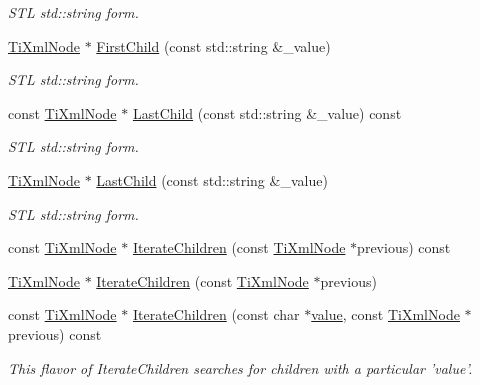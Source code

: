 \begin{DoxyCompactItemize}
\begin{DoxyCompactList}\small\item\em S\-T\-L std\-::string form. \end{DoxyCompactList}\item 
\hyperlink{class_ti_xml_node}{Ti\-Xml\-Node} $\ast$ \hyperlink{class_ti_xml_node_a10d2669ccb5e29e02fcb0e4408685ef6}{First\-Child} (const std\-::string \&\-\_\-value)
\begin{DoxyCompactList}\small\item\em S\-T\-L std\-::string form. \end{DoxyCompactList}\item 
const \hyperlink{class_ti_xml_node}{Ti\-Xml\-Node} $\ast$ \hyperlink{class_ti_xml_node_a256d0cdbfcfeccae83f3a1c9747a8b63}{Last\-Child} (const std\-::string \&\-\_\-value) const 
\begin{DoxyCompactList}\small\item\em S\-T\-L std\-::string form. \end{DoxyCompactList}\item 
\hyperlink{class_ti_xml_node}{Ti\-Xml\-Node} $\ast$ \hyperlink{class_ti_xml_node_a69772c9202f70553f940b15c06b07be3}{Last\-Child} (const std\-::string \&\-\_\-value)
\begin{DoxyCompactList}\small\item\em S\-T\-L std\-::string form. \end{DoxyCompactList}\item 
const \hyperlink{class_ti_xml_node}{Ti\-Xml\-Node} $\ast$ \hyperlink{class_ti_xml_node_aaef7ac3978c4bb1cc8a24ffae7bced75}{Iterate\-Children} (const \hyperlink{class_ti_xml_node}{Ti\-Xml\-Node} $\ast$previous) const 
\item 
\hyperlink{class_ti_xml_node}{Ti\-Xml\-Node} $\ast$ \hyperlink{class_ti_xml_node_a2358e747118fdbf0e467b1e4f7d03de1}{Iterate\-Children} (const \hyperlink{class_ti_xml_node}{Ti\-Xml\-Node} $\ast$previous)
\item 
const \hyperlink{class_ti_xml_node}{Ti\-Xml\-Node} $\ast$ \hyperlink{class_ti_xml_node_af2b86dbe25d3d26fa48180edc5e2a9fc}{Iterate\-Children} (const char $\ast$\hyperlink{class_ti_xml_node_aead528b3cedc33c16a6c539872c7cc8b}{value}, const \hyperlink{class_ti_xml_node}{Ti\-Xml\-Node} $\ast$previous) const 
\begin{DoxyCompactList}\small\item\em This flavor of Iterate\-Children searches for children with a particular 'value'. \end{DoxyCompactList}\item 

\end{DoxyCompactItemize}
